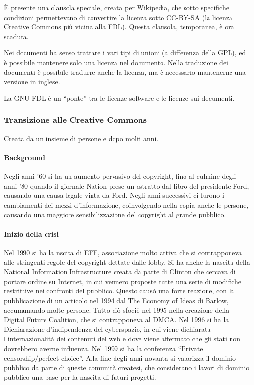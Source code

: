 \`E presente una clausola speciale, creata per Wikipedia, che sotto specifiche condizioni permettevano di convertire la licenza sotto CC-BY-SA (la licenza Creative Commons pi\`u vicina alla FDL). Questa clausola, temporanea, \`e ora scaduta.

Nei documenti ha senso trattare i vari tipi di unioni (a differenza della GPL), ed \`e possibile mantenere solo una licenza nel documento.
Nella traduzione dei documenti \`e possibile tradurre anche la licenza, ma \`e necessario mantenerne una versione in inglese.

La GNU FDL \`e un ``ponte'' tra le licenze software e le licenze sui documenti.

\subsubsection{Transizione alle Creative Commons}

Creata da un insieme di persone e dopo molti anni.

\paragraph*{Background}Negli anni '60 si ha un aumento pervasivo del copyright, fino al culmine degli anni '80 quando il giornale Nation prese un estratto dal libro del presidente Ford, causando una causa legale vinta da Ford. Negli anni successivi ci furono i cambiamenti dei mezzi d'informazione, coinvolgendo nella copia anche le persone, causando una maggiore sensibilizzazione del copyright al grande pubblico.

\paragraph*{Inizio della crisi}Nel 1990 si ha la nscita di EFF, associazione molto attiva che si contrapponeva alle stringenti regole del copyright dettate dalle lobby. Si ha anche la nascita della National Information Infrastructure creata da parte di Clinton che cercava di portare ordine su Internet, in cui vennero proposte tutte una serie di modifiche restrittive nei confronti del pubblico. Questo caus\`o una forte reazione, con la pubblicazione di un articolo nel 1994 dal The Economy of Ideas di Barlow, accumunando molte persone. Tutto ci\`o sfoci\`o nel 1995 nella creazione della Digital Future Coalition, che si contrapponeva al DMCA.
Nel 1996 si ha la Dichiarazione d'indipendenza del cyberspazio, in cui viene dichiarata l'internazionalit\`a dei contenuti del web e dove viene affermato che gli stati non dovrebbero averne influenza.
Nel 1999 si ha la conferenza ``Private censorship/perfect choice''.
Alla fine degli anni novanta si valorizza il dominio pubblico da parte di queste comunit\`a createsi, che considerano i lavori di dominio pubblico una base per la nascita di futuri progetti.
